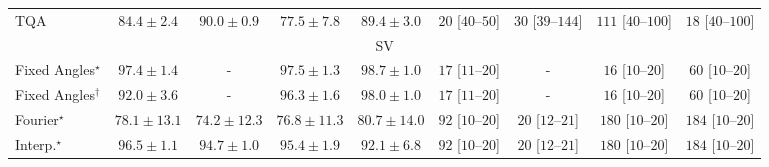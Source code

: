 \begin{tabular}{l|cccc|cccc|}
TQA & {\cellcolor[HTML]{7EC97B}} \color[HTML]{000000} $84.4\pm 2.4$ & {\cellcolor[HTML]{31974F}} \color[HTML]{F1F1F1} $90.0\pm 0.9$ & {\cellcolor[HTML]{DCF1A5}} \color[HTML]{000000} $77.5\pm 7.8$ & {\cellcolor[HTML]{379E54}} \color[HTML]{F1F1F1} $89.4\pm 3.0$ & {\cellcolor[HTML]{FDE4E1}} \color[HTML]{000000} $20$ [$40$--$50$] & {\cellcolor[HTML]{FDD9D6}} \color[HTML]{000000} $30$ [$39$--$144$] & {\cellcolor[HTML]{E23E99}} \color[HTML]{F1F1F1} $111$ [$40$--$100$] & {\cellcolor[HTML]{FEE6E3}} \color[HTML]{000000} $18$ [$40$--$100$] \\
\cline{1-9}
\multicolumn{9}{c}{\rule{0pt}{8pt}SV} \\
\midrule
Fixed Angles$^\star$ & {\cellcolor[HTML]{03446A}} \color[HTML]{F1F1F1} $97.4\pm 1.4$ & {\cellcolor[HTML]{000000}} \color[HTML]{F1F1F1} {\cellcolor{white}} \color{black} - & {\cellcolor[HTML]{03446A}} \color[HTML]{F1F1F1} $97.5\pm 1.3$ & {\cellcolor[HTML]{023858}} \color[HTML]{F1F1F1} $98.7\pm 1.0$ & {\cellcolor[HTML]{FEE7E4}} \color[HTML]{000000} $17$ [$11$--$20$] & {\cellcolor[HTML]{000000}} \color[HTML]{F1F1F1} {\cellcolor{white}} \color{black} - & {\cellcolor[HTML]{FEE9E5}} \color[HTML]{000000} $16$ [$10$--$20$] & {\cellcolor[HTML]{FBAFBA}} \color[HTML]{000000} $60$ [$10$--$20$] \\
Fixed Angles$^\dagger$ & {\cellcolor[HTML]{056EAD}} \color[HTML]{F1F1F1} $92.0\pm 3.6$ & {\cellcolor[HTML]{000000}} \color[HTML]{F1F1F1} {\cellcolor{white}} \color{black} - & {\cellcolor[HTML]{034F7D}} \color[HTML]{F1F1F1} $96.3\pm 1.6$ & {\cellcolor[HTML]{023E62}} \color[HTML]{F1F1F1} $98.0\pm 1.0$ & {\cellcolor[HTML]{FEE7E4}} \color[HTML]{000000} $17$ [$11$--$20$] & {\cellcolor[HTML]{000000}} \color[HTML]{F1F1F1} {\cellcolor{white}} \color{black} - & {\cellcolor[HTML]{FEE9E5}} \color[HTML]{000000} $16$ [$10$--$20$] & {\cellcolor[HTML]{FBAFBA}} \color[HTML]{000000} $60$ [$10$--$20$] \\
Fourier$^\star$ & {\cellcolor[HTML]{CDD0E5}} \color[HTML]{000000} $78.1\pm 13.1$ & {\cellcolor[HTML]{EDE7F2}} \color[HTML]{000000} $74.2\pm 12.3$ & {\cellcolor[HTML]{D8D7E9}} \color[HTML]{000000} $76.8\pm 11.3$ & {\cellcolor[HTML]{ADC1DD}} \color[HTML]{000000} $80.7\pm 14.0$ & {\cellcolor[HTML]{F769A1}} \color[HTML]{F1F1F1} $92$ [$10$--$20$] & {\cellcolor[HTML]{FDE4E1}} \color[HTML]{000000} $20$ [$12$--$21$] & {\cellcolor[HTML]{51006C}} \color[HTML]{F1F1F1} $180$ [$10$--$20$] & {\cellcolor[HTML]{49006A}} \color[HTML]{F1F1F1} $184$ [$10$--$20$] \\
Interp.$^\star$ & {\cellcolor[HTML]{034D79}} \color[HTML]{F1F1F1} $96.5\pm 1.1$ & {\cellcolor[HTML]{045D92}} \color[HTML]{F1F1F1} $94.7\pm 1.0$ & {\cellcolor[HTML]{04588A}} \color[HTML]{F1F1F1} $95.4\pm 1.9$ & {\cellcolor[HTML]{056DAC}} \color[HTML]{F1F1F1} $92.1\pm 6.8$ & {\cellcolor[HTML]{F769A1}} \color[HTML]{F1F1F1} $92$ [$10$--$20$] & {\cellcolor[HTML]{FDE4E1}} \color[HTML]{000000} $20$ [$12$--$21$] & {\cellcolor[HTML]{51006C}} \color[HTML]{F1F1F1} $180$ [$10$--$20$] & {\cellcolor[HTML]{49006A}} \color[HTML]{F1F1F1} $184$ [$10$--$20$] \\

\end{tabular}
